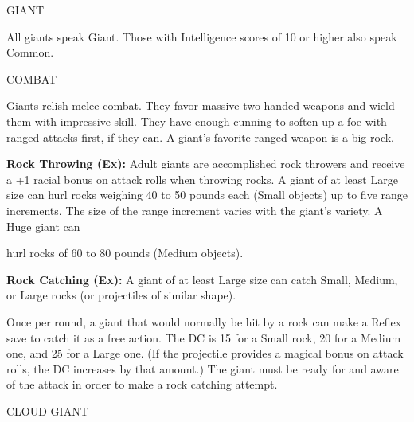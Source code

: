 \documentclass{article}
\begin{document}
\vspace{12pt}
{\LARGE{}GIANT}

All giants speak Giant. Those with Intelligence scores of 10 or higher also speak 
Common.

COMBAT

Giants relish melee combat. They favor massive two-handed weapons and wield them 
with impressive skill. They have enough cunning to soften up a foe with ranged 
attacks first, if they can. A giant's favorite ranged weapon is a big rock.

\textbf{Rock Throwing (Ex): }Adult giants are accomplished rock throwers and receive 
a +1 racial bonus on attack rolls when throwing rocks. A giant of at least Large 
size can hurl rocks weighing 40 to 50 pounds each (Small objects) up to five range 
increments. The size of the range increment varies with the giant's variety. A 
Huge giant can

hurl rocks of 60 to 80 pounds (Medium objects). 

\textbf{Rock Catching (Ex):} A giant of at least Large size can catch Small, Medium, 
or Large rocks (or projectiles of similar shape).

Once per round, a giant that would normally be hit by a rock can make a Reflex 
save to catch it as a free action. The DC is 15 for a Small rock, 20 for a Medium 
one, and 25 for a Large one. (If the projectile provides a magical bonus on attack 
rolls, the DC increases by that amount.) The giant must be ready for and aware 
of the attack in order to make a rock catching attempt.

\vspace{12pt}
CLOUD GIANT
\end{document}
